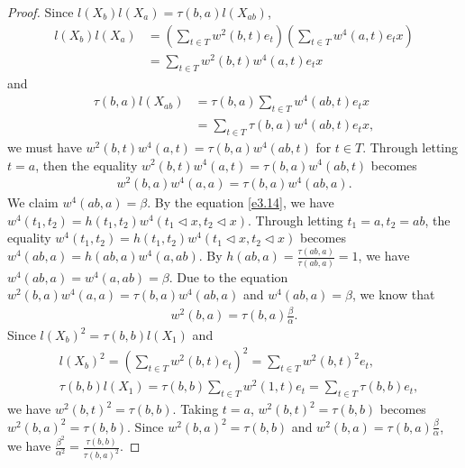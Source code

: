 \documentclass[a4paper,11pt]{amsart}
\numberwithin{equation}{section}
\begin{document}
\begin{proof}
 Since $l(X_b)l(X_a)=\tau(b,a) l(X_{ab})$,
\begin{align*}
l(X_b)l(X_a)&=(\sum_{t\in T} w^2(b,t)e_t)(\sum_{t\in T} w^4(a,t)e_t x)\\
&=\sum_{t\in T}w^2(b,t) w^4(a,t)e_t x
\end{align*}
and
\begin{align*}
\tau(b,a) l(X_{ab})&=\tau(b,a) \sum_{t\in T} w^4(ab,t)e_t x\\
&=\sum_{t\in T} \tau(b,a) w^4(ab,t)e_t x,
\end{align*}
 we must have $w^2(b,t) w^4(a,t)=\tau(b,a) w^4(ab,t)$ for $t\in T$. Through letting $t=a$, then the equality $w^2(b,t) w^4(a,t)=\tau(b,a) w^4(ab,t)$ becomes
\begin{align}
\label{temp1} w^2(b,a)w^4(a,a)=\tau(b,a) w^4(ab,a).
\end{align}
We claim $w^4(ab,a)=\beta$. By the equation \eqref{e3.14}, we have $w^4(t_1,t_2)=h(t_1,t_2) w^4(t_1 \triangleleft x, t_2 \triangleleft x)$. Through letting $t_1=a,t_2=ab$, the equality $w^4(t_1,t_2)=h(t_1,t_2) w^4(t_1 \triangleleft x, t_2 \triangleleft x)$ becomes $w^4(ab,a)=h(ab,a)w^4(a,ab)$. By $h(ab,a)=\frac{\tau(ab,a)}{\tau(ab,a)}=1$, we have $w^4(ab,a)=w^4(a,ab)=\beta$. Due to the equation $w^2(b,a)w^4(a,a)=\tau(b,a) w^4(ab,a)$ and $w^4(ab,a)=\beta$, we know that
\begin{align}
\label{temp2} w^2(b,a)=\tau(b,a) \frac{\beta}{\alpha}.
\end{align}
Since $l(X_b)^2=\tau(b,b)l(X_1)$ and
\begin{align*}
&l(X_b)^2=(\sum_{t\in T} w^2(b,t)e_t)^2=\sum_{t\in T}w^2(b,t)^2 e_t,\\
&\tau(b,b)l(X_1)=\tau(b,b) \sum_{t\in T} w^2(1,t)e_t=\sum_{t\in T}\tau(b,b) e_t,
\end{align*}
 we have $w^2(b,t)^2=\tau(b,b)$. Taking $t=a$, $w^2(b,t)^2=\tau(b,b)$ becomes
$w^2(b,a)^2=\tau(b,b)$. Since  $w^2(b,a)^2=\tau(b,b)$ and $w^2(b,a)=\tau(b,a) \frac{\beta}{\alpha}$, we have $\frac{\beta^2}{\alpha^2}=\frac{\tau(b,b)}{\tau(b,a)^2}$.
\end{proof}
\end{document}
